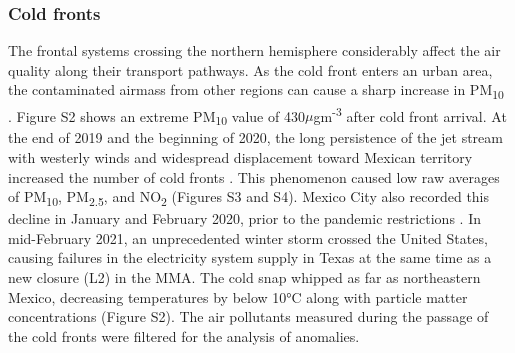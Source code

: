\documentclass[preprint,12pt]{elsarticle}
\begin{document}
\subsubsection{Cold fronts}
The frontal systems crossing the northern hemisphere considerably affect the air quality along their transport pathways. As the cold front enters an urban area, the contaminated airmass from other regions can cause a sharp increase in PM\textsubscript{10} \citep{Kang_2019}. Figure S2 shows an extreme PM\textsubscript{10} value of 430$\mu$gm\textsuperscript{-3} after cold front arrival. At the end of 2019 and the beginning of 2020, the long persistence of the jet stream with westerly winds and widespread displacement toward Mexican territory increased the number of cold fronts \citep{yucatn}. This phenomenon caused low raw averages of PM\textsubscript{10}, PM\textsubscript{2.5}, and NO\textsubscript{2} (Figures S3 and S4). Mexico City also recorded this decline in January and February 2020, prior to the pandemic restrictions \citep{Vega_2021}. In mid-February 2021, an unprecedented winter storm crossed the United States, causing failures in the electricity system supply in Texas \citep{Doss_Gollin_2021,years} at the same time as a new closure (L2) in the MMA. The cold snap whipped as far as northeastern Mexico, decreasing temperatures by below 10°C along with particle matter concentrations (Figure S2). The air pollutants measured during the passage of the cold fronts were filtered for the analysis of anomalies. 
\end{document}

